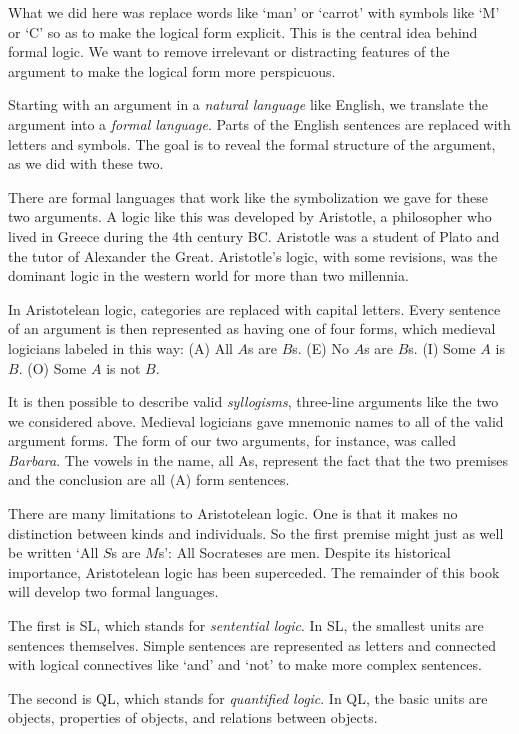 What we did here was replace words like `man' or `carrot' with symbols like `M' or `C' so as to make the logical form explicit. This is the central idea behind formal logic. We want to remove irrelevant or distracting features of the argument to make the logical form more perspicuous.

Starting with an argument in a \emph{natural language} like English, we translate the argument into a \emph{formal language}. Parts of the English sentences are replaced with letters and symbols. The goal is to reveal the formal structure of the argument, as we did with these two.

There are formal languages that work like the symbolization we gave for these two arguments. A logic like this was developed by Aristotle, a philosopher who lived in Greece during the 4th century BC. Aristotle was a student of Plato and the tutor of Alexander the Great. Aristotle's logic, with some revisions, was the dominant logic in the western world for more than two millennia.

In Aristotelean logic, categories are replaced with capital letters. Every sentence of an argument is then represented as having one of four forms, which medieval logicians labeled in this way: (A) All $A$s are $B$s. (E) No $A$s are $B$s. (I) Some $A$ is $B$. (O) Some $A$ is not $B$.

It is then possible to describe valid \emph{syllogisms}, three-line arguments like the two we considered above. Medieval logicians gave mnemonic names to all of the valid argument forms. The form of our two arguments, for instance, was called \emph{Barbara}. The vowels in the name, all As, represent the fact that the two premises and the conclusion are all (A) form sentences.

There are many limitations to Aristotelean logic. One is that it makes no distinction between kinds and individuals. So the first premise might just as well be written `All $S$s are $M$s': All Socrateses are men. Despite its historical importance, Aristotelean logic has been superceded. The remainder of this book will develop two formal languages.

The first is SL, which stands for \emph{sentential logic}. In SL, the smallest units are sentences themselves. Simple sentences are represented as letters and connected with {logical connectives} like `and' and `not' to make more complex sentences.

The second is QL, which stands for \emph{quantified logic}. In QL, the basic units are objects, properties of objects, and relations between objects.




